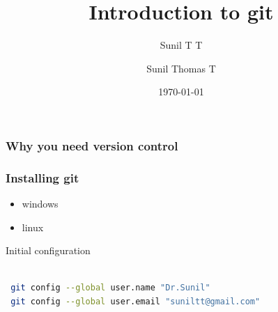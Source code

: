 \documentclass[10pt,a4paper]{beamer}
\author{Sunil T T }
\title[EC1302]{ Introduction to  git \\ \textcolor{blue}{ } } %
\author{Sunil Thomas T} %
\institute[College of Engineering Attingal] %
{College of Engineering Attingal
\\ %
\medskip
\textit{suniltt@gmail.com} %
}
\date{\today} %
\begin{document}
 \begin{frame}
\titlepage %
\end{frame}


\begin{frame}
\frametitle{  Why you need version control}


\end{frame}


\begin{frame}[fragile]
\frametitle{  Installing git}
\begin{itemize}
    
    \item windows
    \item  linux
\end{itemize}

Initial configuration

\begin{lstlisting}[language=bash]

 git config --global user.name "Dr.Sunil"
 git config --global user.email "suniltt@gmail.com"
 
\end{lstlisting}
\end{frame}

\end{document}
